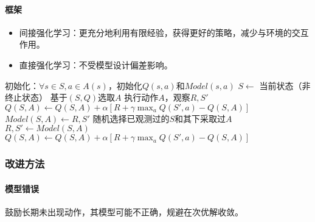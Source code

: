\documentclass[
12pt, %
a4paper, 
oneside, %
headinclude,footinclude, %
]{scrartcl}
\begin{document}
\paragraph{框架}
\begin{itemize}
\item 间接强化学习：更充分地利用有限经验，获得更好的策略，减少与环境的交互作用。
\item 直接强化学习：不受模型设计偏差影响。
\end{itemize}
\begin{myalgorithm}[表格型Dyna-Q]
\State 初始化：$ \forall s \in S, a \in A(s) $，初始化$ Q(s, a) $和$ Model(s, a) $
\Loop
\State $ S \gets $ 当前状态（非终止状态）
\State 基于$ (S, Q) $选取$ A $ 
\State 执行动作$ A $，观察$ R,S' $
\State $ Q(S, A) \gets Q(S, A) + \alpha[R + \gamma \max_a Q(S', a) - Q(S, A)] $ 
\State $ Model(S, A) \gets R,S' $
 
\State 随机选择已观测过的$ S $和其下采取过$ A $
\State $ R,S' \gets Model(S, A) $ 
\State $ Q(S, A) \gets Q(S, A) + \alpha[R + \gamma \max_a Q(S', a) - Q(S, A)] $ 
\EndFor
\EndLoop
\end{myalgorithm}
\subsubsection[改进方法]{改进方法}
\paragraph{模型错误}
鼓励长期未出现动作，其模型可能不正确，规避在次优解收敛。
\end{document}
